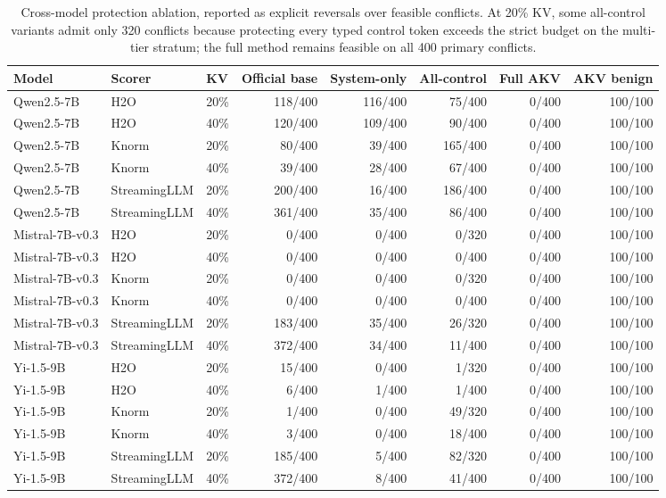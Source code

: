 \begin{table}[t]
\centering
\scriptsize
\setlength{\tabcolsep}{3.0pt}
\begin{tabular}{lllrrrrr}
\toprule
Model & Scorer & KV & Official base & System-only & All-control & Full AKV & AKV benign \\
\midrule
Qwen2.5-7B & H2O & 20\% & 118/400 & 116/400 & 75/400 & 0/400 & 100/100 \\
Qwen2.5-7B & H2O & 40\% & 120/400 & 109/400 & 90/400 & 0/400 & 100/100 \\
Qwen2.5-7B & Knorm & 20\% & 80/400 & 39/400 & 165/400 & 0/400 & 100/100 \\
Qwen2.5-7B & Knorm & 40\% & 39/400 & 28/400 & 67/400 & 0/400 & 100/100 \\
Qwen2.5-7B & StreamingLLM & 20\% & 200/400 & 16/400 & 186/400 & 0/400 & 100/100 \\
Qwen2.5-7B & StreamingLLM & 40\% & 361/400 & 35/400 & 86/400 & 0/400 & 100/100 \\
\midrule
Mistral-7B-v0.3 & H2O & 20\% & 0/400 & 0/400 & 0/320 & 0/400 & 100/100 \\
Mistral-7B-v0.3 & H2O & 40\% & 0/400 & 0/400 & 0/400 & 0/400 & 100/100 \\
Mistral-7B-v0.3 & Knorm & 20\% & 0/400 & 0/400 & 0/320 & 0/400 & 100/100 \\
Mistral-7B-v0.3 & Knorm & 40\% & 0/400 & 0/400 & 0/400 & 0/400 & 100/100 \\
Mistral-7B-v0.3 & StreamingLLM & 20\% & 183/400 & 35/400 & 26/320 & 0/400 & 100/100 \\
Mistral-7B-v0.3 & StreamingLLM & 40\% & 372/400 & 34/400 & 11/400 & 0/400 & 100/100 \\
\midrule
Yi-1.5-9B & H2O & 20\% & 15/400 & 0/400 & 1/320 & 0/400 & 100/100 \\
Yi-1.5-9B & H2O & 40\% & 6/400 & 1/400 & 1/400 & 0/400 & 100/100 \\
Yi-1.5-9B & Knorm & 20\% & 1/400 & 0/400 & 49/320 & 0/400 & 100/100 \\
Yi-1.5-9B & Knorm & 40\% & 3/400 & 0/400 & 18/400 & 0/400 & 100/100 \\
Yi-1.5-9B & StreamingLLM & 20\% & 185/400 & 5/400 & 82/320 & 0/400 & 100/100 \\
Yi-1.5-9B & StreamingLLM & 40\% & 372/400 & 8/400 & 41/400 & 0/400 & 100/100 \\
\bottomrule
\end{tabular}
\caption{Cross-model protection ablation, reported as explicit reversals over feasible conflicts. At 20\% KV, some all-control variants admit only 320 conflicts because protecting every typed control token exceeds the strict budget on the multi-tier stratum; the full method remains feasible on all 400 primary conflicts.}
\label{tab:crossmodel-ablation}
\end{table}
